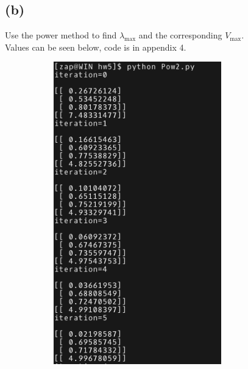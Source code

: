 \documentclass{article}
\begin{document}
\subsection*{(b)}
Use the power method to find $\lambda_{\text{max}}$ and the corresponding $V_{\text{max}}$.\\
Values can be seen below, code is in appendix 4.
\begin{figure}[H]
    \centering
    \begin{subfigure}[b]{0.49\textwidth}
        \includegraphics[width=0.8\textwidth]{p4b1.png}
    \end{subfigure}
    \begin{subfigure}[b]{0.49\textwidth}

\end{subfigure}
\end{figure}
\end{document}
